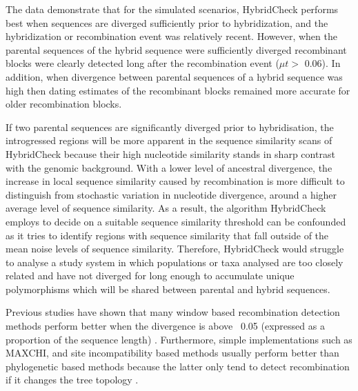 The data demonstrate that for the simulated scenarios, HybridCheck performs best when sequences are diverged sufficiently prior to hybridization, and the hybridization or recombination event was relatively recent.
However, when the parental sequences of the hybrid sequence were sufficiently diverged recombinant blocks were clearly detected long after the recombination event ($\mu t >$ 0.06).
In addition, when divergence between parental sequences of a hybrid sequence was high then dating estimates of the recombinant blocks remained more accurate for older recombination blocks. 

If two parental sequences are significantly diverged prior to hybridisation, the introgressed regions will be more apparent in the sequence similarity scans of HybridCheck because their high nucleotide similarity stands in sharp contrast with the genomic background.
With a lower level of ancestral divergence, the increase in local sequence similarity caused by recombination is more difficult to distinguish from stochastic variation in nucleotide divergence, around a higher average level of sequence similarity.
As a result, the algorithm HybridCheck employs to decide on a suitable sequence similarity threshold can be confounded as it tries to identify regions with sequence similarity that fall outside of the mean noise levels of sequence similarity.
Therefore, HybridCheck would struggle to analyse a study system in which populations or taxa analysed are too closely related and have not diverged for long enough to accumulate unique polymorphisms which will be shared between parental and hybrid sequences. 

Previous studies have shown that many window based recombination detection methods perform better when the divergence is above ~0.05 (expressed as a proportion of the sequence length) \parencite{Posada2001b}.
Furthermore, simple implementations such as MAXCHI, and site incompatibility based methods usually perform better than phylogenetic based methods because the latter only tend to detect recombination if it changes the tree topology \parencite{Posada2001b}.

